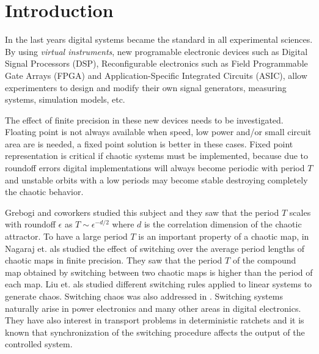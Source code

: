 \section{Introduction} \label{sec:intro}

In the last years digital systems became the standard in all experimental sciences.
By using \textit{virtual instruments}, new programable electronic devices such as Digital Signal Processors (DSP), Reconfigurable electronics such as Field Programmable Gate Arrays (FPGA) and Application-Specific Integrated Circuits (ASIC), allow experimenters to design and modify their own signal generators, measuring systems, simulation models, etc.

The effect of finite precision in these new devices needs to be investigated.
Floating point is not always available when speed, low power and/or small circuit area are is needed, a fixed point solution is better in these cases.
Fixed point representation is critical if chaotic systems must be implemented, because due to roundoff errors digital implementations will always become periodic with period $T$ and unstable orbits with a low periods may become stable destroying completely the chaotic behavior.

Grebogi and coworkers \cite{Grebogi1988} studied this subject and they saw that the period $T$ scales with roundoff $\epsilon$ as $T\sim\epsilon^{-d/2}$ where $d$ is the correlation dimension of the chaotic attractor.
To have a large period $T$ is an important property of a chaotic map, in \cite{Nagaraj2008} Nagaraj et. als studied the effect of switching over the average period lengths of chaotic maps in finite precision.
They saw that the period $T$ of the compound map obtained by switching between two chaotic maps is higher than the period of each map.
Liu et. als \cite{Liu2006} studied different switching rules applied to linear systems to generate chaos.
Switching chaos was also addressed in \cite{Gluskin2008}.
Switching systems naturally arise in power electronics and many other areas in digital electronics.
They have also interest in transport problems in deterministic ratchets \cite{Zarlenga2009} and it is known that synchronization of the switching procedure affects the output of the controlled system.

